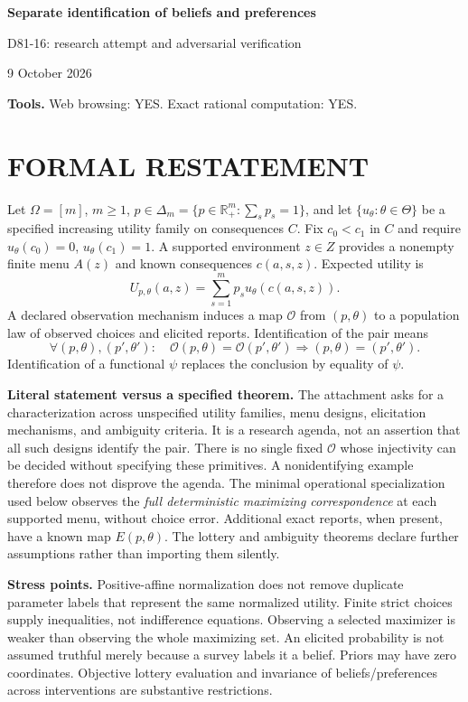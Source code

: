\documentclass[11pt,a4paper]{article}
\theoremstyle{definition}\newtheorem{definition}[theorem]{Definition}
\theoremstyle{remark}\newtheorem{remark}[theorem]{Remark}
\newcommand{\R}{\mathbb R}\newcommand{\Q}{\mathbb Q}
\newcommand{\1}{\mathbf 1}
\begin{document}
\begin{center}
{\Large\bfseries Separate identification of beliefs and preferences}\par
\medskip
{\large D81-16: research attempt and adversarial verification}\par
9 October 2026
\end{center}
\textbf{Tools.} Web browsing: YES. Exact rational computation: YES.\par
\section{FORMAL RESTATEMENT}
Let $\Omega=[m]$, $m\ge1$, $p\in\Delta_m=\{p\in\R_+^m:\sum_sp_s=1\}$, and let $\{u_\theta:\theta\in\Theta\}$ be a specified increasing utility family on consequences $C$. Fix $c_0<c_1$ in $C$ and require $u_\theta(c_0)=0$, $u_\theta(c_1)=1$. A supported environment $z\in Z$ provides a nonempty finite menu $A(z)$ and known consequences $c(a,s,z)$. Expected utility is
\[
 U_{p,\theta}(a,z)=\sum_{s=1}^m p_su_\theta(c(a,s,z)).
\]
A declared observation mechanism induces a map $\mathcal O$ from $(p,\theta)$ to a population law of observed choices and elicited reports. Identification of the pair means
\[
 \forall(p,\theta),(p',\theta'):\quad
 \mathcal O(p,\theta)=\mathcal O(p',\theta')
 \Longrightarrow (p,\theta)=(p',\theta').
\]
Identification of a functional $\psi$ replaces the conclusion by equality of $\psi$.

\textbf{Literal statement versus a specified theorem.} The attachment asks for a characterization across unspecified utility families, menu designs, elicitation mechanisms, and ambiguity criteria. It is a research agenda, not an assertion that all such designs identify the pair. There is no single fixed $\mathcal O$ whose injectivity can be decided without specifying these primitives. A nonidentifying example therefore does not disprove the agenda. The minimal operational specialization used below observes the \emph{full deterministic maximizing correspondence} at each supported menu, without choice error. Additional exact reports, when present, have a known map $E(p,\theta)$. The lottery and ambiguity theorems declare further assumptions rather than importing them silently.

\textbf{Stress points.} Positive-affine normalization does not remove duplicate parameter labels that represent the same normalized utility. Finite strict choices supply inequalities, not indifference equations. Observing a selected maximizer is weaker than observing the whole maximizing set. An elicited probability is not assumed truthful merely because a survey labels it a belief. Priors may have zero coordinates. Objective lottery evaluation and invariance of beliefs/preferences across interventions are substantive restrictions.
\end{document}
